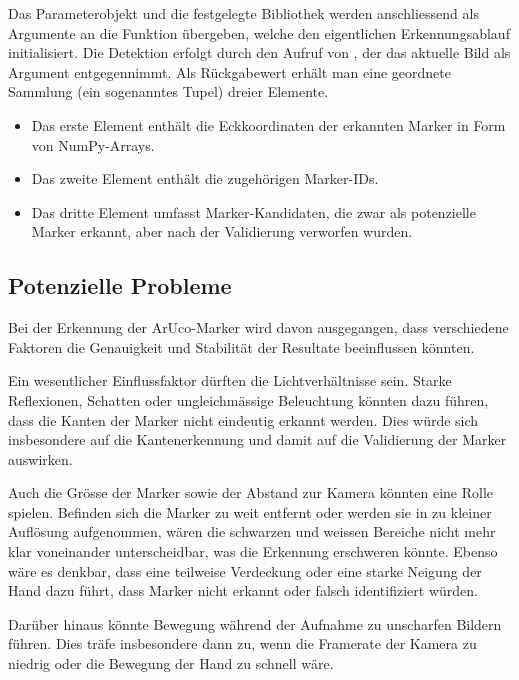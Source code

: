Das Parameterobjekt und die festgelegte Bibliothek werden anschliessend als Argumente an die Funktion  übergeben, welche den eigentlichen Erkennungsablauf initialisiert.
Die Detektion erfolgt durch den Aufruf von , der das aktuelle Bild als Argument entgegennimmt.
Als Rückgabewert erhält man eine geordnete Sammlung (ein sogenanntes Tupel) dreier Elemente.

\begin{itemize}
    \item Das erste Element enthält die Eckkoordinaten der erkannten Marker in Form von NumPy-Arrays.
    \item Das zweite Element enthält die zugehörigen Marker-IDs.
    \item Das dritte Element umfasst Marker-Kandidaten\footnotemark{}, die zwar als potenzielle Marker erkannt, aber nach der Validierung verworfen wurden.
\end{itemize}


\subsection{Potenzielle Probleme}
Bei der Erkennung der ArUco-Marker wird davon ausgegangen, dass verschiedene Faktoren die Genauigkeit und Stabilität der Resultate beeinflussen könnten.

Ein wesentlicher Einflussfaktor dürften die Lichtverhältnisse sein.
Starke Reflexionen, Schatten oder ungleichmässige Beleuchtung könnten dazu führen, dass die Kanten der Marker nicht eindeutig erkannt werden.
Dies würde sich insbesondere auf die Kantenerkennung und damit auf die Validierung der Marker auswirken.

Auch die Grösse der Marker sowie der Abstand zur Kamera könnten eine Rolle spielen.
Befinden sich die Marker zu weit entfernt oder werden sie in zu kleiner Auflösung aufgenommen, wären die schwarzen und weissen Bereiche nicht mehr klar voneinander unterscheidbar, was die Erkennung erschweren könnte.
Ebenso wäre es denkbar, dass eine teilweise Verdeckung oder eine starke Neigung der Hand dazu führt, dass Marker nicht erkannt oder falsch identifiziert würden.

Darüber hinaus könnte Bewegung während der Aufnahme zu unscharfen Bildern führen.
Dies träfe insbesondere dann zu, wenn die Framerate der Kamera zu niedrig oder die Bewegung der Hand zu schnell wäre.

